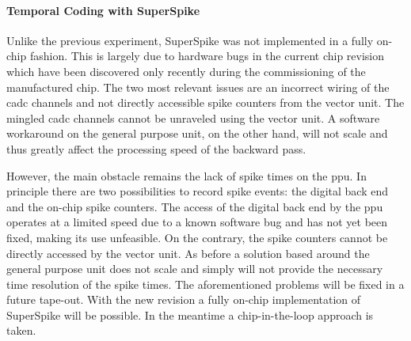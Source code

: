\paragraph{Temporal Coding with SuperSpike} Unlike the previous experiment, SuperSpike was not implemented in a fully on-chip fashion. This is largely due to hardware bugs in the current chip revision which have been discovered only recently during the commissioning of the manufactured chip. The two most relevant issues are an incorrect wiring of the \gls{cadc} channels and not directly accessible spike counters from the vector unit. The mingled \gls{cadc} channels cannot be unraveled using the vector unit. A software workaround on the general purpose unit, on the other hand, will not scale and thus greatly affect the processing speed of the backward pass.

However, the main obstacle remains the lack of spike times on the \gls{ppu}. In principle there are two possibilities to record spike events: the digital back end and the on-chip spike counters. The access of the digital back end by the \gls{ppu} operates at a limited speed due to a known software bug and has not yet been fixed, making its use unfeasible. On the contrary, the spike counters cannot be directly accessed by the vector unit. As before a solution based around the general purpose unit does not scale and simply will not provide the necessary time resolution of the spike times. The aforementioned problems will be fixed in a future tape-out. With the new revision a fully on-chip implementation of SuperSpike will be possible. In the meantime a chip-in-the-loop approach is taken.

